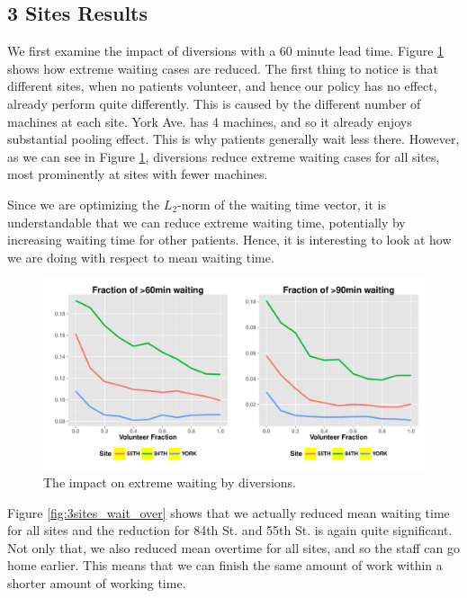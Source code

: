 \subsection{3 Sites Results}

We first examine the impact of diversions with a 60 minute
lead time. Figure \ref{fig:3sites_extreme} shows how extreme
waiting cases are reduced. The first thing to notice is that
different sites, when no patients volunteer, and hence our
policy has no effect, already perform quite differently. This is caused by
the different number of machines at each site. York Ave. has 4 machines,
and so it already enjoys substantial pooling effect. This is why patients
generally wait less there. However, as we can see in Figure \ref{fig:3sites_extreme},
diversions reduce extreme waiting cases for all sites, most
prominently at sites with fewer machines.

Since we are optimizing the $L_2$-norm of the waiting time vector,
it is understandable that we can reduce extreme waiting time,
potentially by increasing waiting time for other patients.
Hence, it is interesting to look at how we are doing with respect to mean waiting
time.

\begin{figure}[htp]
\centering
\includegraphics[width=.95\textwidth]{chap3/numeric/pic/3sites_extreme}
\caption{The impact on extreme waiting by diversions.}
\label{fig:3sites_extreme}
\end{figure}

Figure \ref{fig:3sites_wait_over} shows that we actually
reduced mean waiting time for all sites and the reduction
for 84th St. and 55th St. is again quite significant.
Not only that, we also reduced mean overtime for all sites, and so
the staff can go home earlier. This means that we can finish
the same amount of work within a shorter amount of working time.

